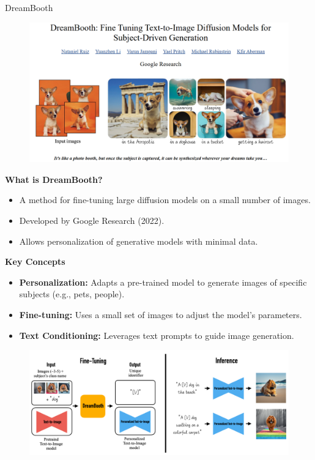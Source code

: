 \begin{frame}[allowframebreaks]{DreamBooth}
\begin{figure}
    \centering
    \includegraphics[width=\linewidth,height=\textheight,keepaspectratio]{images/adv-img-gen/dreambooth-1.png}
\end{figure}

\framebreak
\textbf{What is DreamBooth?}
\begin{itemize}
    \item A method for fine-tuning large diffusion models on a small number of images.
    \item Developed by Google Research (2022).
    \item Allows personalization of generative models with minimal data.
\end{itemize}

\framebreak
\textbf{Key Concepts}
\begin{itemize}
    \item \textbf{Personalization:} Adapts a pre-trained model to generate images of specific subjects (e.g., pets, people).
    \item \textbf{Fine-tuning:} Uses a small set of images to adjust the model's parameters.
    \item \textbf{Text Conditioning:} Leverages text prompts to guide image generation.
\end{itemize}

\framebreak

\begin{figure}
    \centering
    \includegraphics[width=\linewidth,height=\textheight,keepaspectratio]{images/adv-img-gen/dreambooth-2.png}
\end{figure}


\end{frame}
